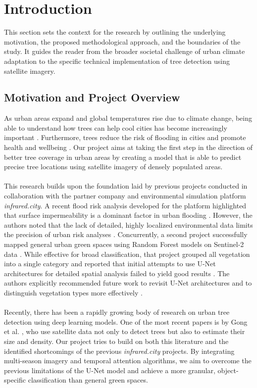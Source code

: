 \section{Introduction}

This section sets the context for the research by outlining the underlying motivation, the proposed methodological approach, and the boundaries of the study. It guides the reader from the broader societal challenge of urban climate adaptation to the specific technical implementation of tree detection using satellite imagery.

\subsection{Motivation and Project Overview}

As urban areas expand and global temperatures rise due to climate change, being able to understand how trees can help cool cities has become increasingly important \cite{eu2023tree}. Furthermore, trees reduce the risk of flooding in cities and promote health and wellbeing \cite{woodlandtrust2023}. Our project aims at taking the first step in the direction of better tree coverage in urban areas by creating a model that is able to predict precise tree locations using satellite imagery of densely populated areas. \\
\\
This research builds upon the foundation laid by previous projects conducted in collaboration with the partner company and environmental simulation platform \textit{infrared.city}. A recent flood risk analysis developed for the platform highlighted that surface impermeability is a dominant factor in urban flooding \cite{marco2026floodrisk}. However, the authors noted that the lack of detailed, highly localized environmental data limits the precision of urban risk analyses \cite{marco2026floodrisk}. Concurrently, a second project successfully mapped general urban green spaces using Random Forest models on Sentinel-2 data \cite{gotschim2026greenspace}. While effective for broad classification, that project grouped all vegetation into a single category and reported that initial attempts to use U-Net architectures for detailed spatial analysis failed to yield good results \cite{gotschim2026greenspace}. The authors explicitly recommended future work to revisit U-Net architectures and to distinguish vegetation types more effectively \cite{gotschim2026greenspace}. \\
\\
Recently, there has been a rapidly growing body of research on urban tree detection using deep learning models. One of the most recent papers is by Gong et al. \cite{gong2024treedetector}, who use satellite data not only to detect trees but also to estimate their size and density. Our project tries to build on both this literature and the identified shortcomings of the previous \textit{infrared.city} projects. By integrating multi-season imagery and temporal attention algorithms, we aim to overcome the previous limitations of the U-Net model and achieve a more granular, object-specific classification than general green spaces. 

